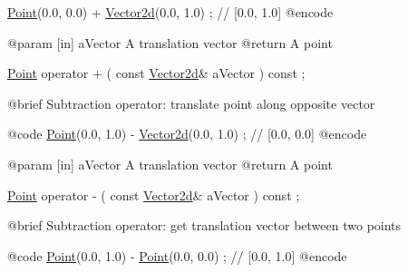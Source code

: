 \begin{DoxyCode}
                        \hyperlink{classlibrary_1_1math_1_1geom_1_1d2_1_1objects_1_1_point_a4998aefdf80bdfd967f21d49fa050398}{Point}(0.0, 0.0) + \hyperlink{namespacelibrary_1_1math_1_1obj_a2fa27512c4f4b07db35d602cfdd2c293}{Vector2d}(0.0, 1.0) ; \textcolor{comment}{// [0.0, 1.0]}
    @encode
   
    @param              [in] aVector A translation vector
    @\textcolor{keywordflow}{return}             A point

\hyperlink{classlibrary_1_1math_1_1geom_1_1d2_1_1objects_1_1_point_a4998aefdf80bdfd967f21d49fa050398}{Point}                   operator +                                  (   \textcolor{keyword}{const}   
      \hyperlink{namespacelibrary_1_1math_1_1obj_a2fa27512c4f4b07db35d602cfdd2c293}{Vector2d}&                   aVector                                     ) \textcolor{keyword}{const} ;

    @brief              Subtraction \textcolor{keyword}{operator}: translate point along opposite vector
   
    @code
                        \hyperlink{classlibrary_1_1math_1_1geom_1_1d2_1_1objects_1_1_point_a4998aefdf80bdfd967f21d49fa050398}{Point}(0.0, 1.0) - \hyperlink{namespacelibrary_1_1math_1_1obj_a2fa27512c4f4b07db35d602cfdd2c293}{Vector2d}(0.0, 1.0) ; \textcolor{comment}{// [0.0, 0.0]}
    @encode
   
    @param              [in] aVector A translation vector
    @\textcolor{keywordflow}{return}             A point

\hyperlink{classlibrary_1_1math_1_1geom_1_1d2_1_1objects_1_1_point_a4998aefdf80bdfd967f21d49fa050398}{Point}                   operator -                                  (   \textcolor{keyword}{const}   
      \hyperlink{namespacelibrary_1_1math_1_1obj_a2fa27512c4f4b07db35d602cfdd2c293}{Vector2d}&                   aVector                                     ) \textcolor{keyword}{const} ;

    @brief              Subtraction \textcolor{keyword}{operator}: \textcolor{keyword}{get} translation vector between two points
   
    @code
                        \hyperlink{classlibrary_1_1math_1_1geom_1_1d2_1_1objects_1_1_point_a4998aefdf80bdfd967f21d49fa050398}{Point}(0.0, 1.0) - \hyperlink{classlibrary_1_1math_1_1geom_1_1d2_1_1objects_1_1_point_a4998aefdf80bdfd967f21d49fa050398}{Point}(0.0, 0.0)  ; \textcolor{comment}{// [0.0, 1.0]}
    @encode
   

\end{DoxyCode}
